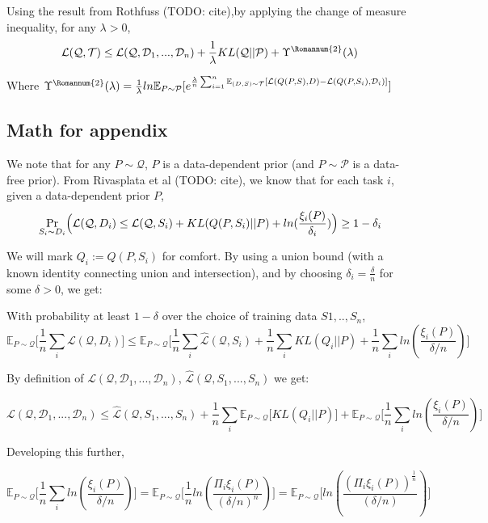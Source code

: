 \documentclass[letterpaper]{article}
\theoremstyle{definition}
\begin{document}
Using the result from Rothfuss (TODO: cite),by applying the change of measure inequality, for any $\lambda>0$,
$$\mathcal{L}(\mathcal{Q}, \mathcal{T})\leq \mathcal{L}(\mathcal{Q}, \mathcal{D}_1,...,\mathcal{D}_n) + \frac{1}{\lambda} KL(\mathcal{Q}||\mathcal{P})+\Upsilon^{\text{\Romannum{2}}}(\lambda)$$

Where $\Upsilon^{\text{\Romannum{2}}}(\lambda)=\frac{1}{\lambda}ln \mathbb{E}_{P\sim \mathcal{P}} [e^{\frac{\lambda}{n}\sum_{i=1}^{n}\mathbb{E}_{(D,S)\sim \mathcal{T}}[\mathcal{L}(Q(P,S),D)- \mathcal{L}(Q(P, S_i), \mathcal{D}_i)]}]$

\subsection{Math for appendix}

We note that for any $P\sim \mathcal{Q}$, $P$ is a data-dependent prior (and $P\sim \mathcal{P}$ is a data-free prior).
From Rivasplata et al (TODO: cite), we know that for each task $i$, given a data-dependent prior $P$,
$$\Pr_{S_i\sim D_i}\Bigl ( \mathcal{L}(\mathcal{Q}, D_i)\leq \mathcal{L}(\mathcal{Q}, S_i) + KL(Q(P,S_i)||P) + ln(\frac{\xi_i(P)}{\delta_i}) \Bigr )\geq 1-\delta_i$$

We will mark $Q_i:=Q(P,S_i)$ for comfort.
By using a union bound (with a known identity connecting union and intersection), and by choosing $\delta_i=\frac{\delta}{n}$ for some $\delta>0$, we get:

With probability at least $1-\delta$ over the choice of training data $S1,..,S_n$,
$$\mathbb{E}_{P\sim \mathcal{Q}} \bigl [ \frac{1}{n}\sum_i \mathcal{L}(\mathcal{Q}, D_i) \Bigr ] \leq \mathbb{E}_{P\sim \mathcal{Q}} \bigl [ \frac{1}{n}\sum_i \hat{\mathcal{L}}(\mathcal{Q}, S_i) + \frac{1}{n}\sum_i KL(Q_i||P) + \frac{1}{n}\sum_i ln(\frac{\xi_i(P)}{\delta/n}) \Bigr ]$$


By definition of $ \mathcal{L}(\mathcal{Q}, \mathcal{D}_1,...,\mathcal{D}_n)$,  $ \hat{\mathcal{L}}(\mathcal{Q}, S_1,...,S_n)$ we get:

$$\mathcal{L}(\mathcal{Q}, \mathcal{D}_1,...,\mathcal{D}_n) \leq \hat{\mathcal{L}}(\mathcal{Q}, S_1,...,S_n) + \frac{1}{n}\sum_i \mathbb{E}_{P\sim \mathcal{Q}} \bigl [KL(Q_i||P) \Bigr ] + \mathbb{E}_{P\sim \mathcal{Q}} \bigl [ \frac{1}{n}\sum_i ln(\frac{\xi_i(P)}{\delta/n}) \Bigr ]$$

Developing this further,

$$ \mathbb{E}_{P\sim \mathcal{Q}} \bigl [ \frac{1}{n}\sum_i ln(\frac{\xi_i(P)}{\delta/n}) \Bigr ] = \mathbb{E}_{P\sim \mathcal{Q}} \bigl [ \frac{1}{n}ln(\frac{\Pi_i\xi_i(P)}{(\delta/n)^n}) \Bigr ] = \mathbb{E}_{P\sim \mathcal{Q}} \bigl [ ln(\frac{(\Pi_i\xi_i(P))^{\frac{1}{n}}}{(\delta/n)}) \Bigr ]$$
\end{document}
